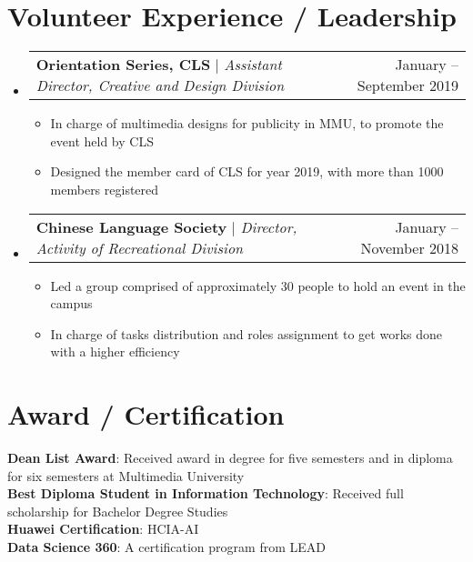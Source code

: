 \documentclass[a4,10pt]{article}
\makeatletter
\newcommand{\resumeItem}[1]{
  \item\small{
    {#1 \vspace{-2pt}}
  }
}
\newcommand{\resumeProjectHeading}[2]{
    \item
    \begin{tabular*}{0.97\textwidth}{l@{\extracolsep{\fill}}r}
      \small#1 & #2 \\
    \end{tabular*}\vspace{-6pt}
}
\newcommand{\resumeSubHeadingListStart}{\begin{itemize}[leftmargin=0.15in, label={}]}
\newcommand{\resumeSubHeadingListEnd}{\end{itemize}}
\newcommand{\resumeItemListStart}{\begin{itemize}}
\newcommand{\resumeItemListEnd}{\end{itemize}\vspace{-5pt}}
\makeatother
\begin{document}
 \section{Volunteer Experience / Leadership}
 \resumeSubHeadingListStart
 \resumeProjectHeading
 {\textbf{Orientation Series, CLS} $|$ \emph{Assistant Director, Creative and Design Division}}{January -- September 2019}
 \resumeItemListStart
 \resumeItem{In charge of multimedia designs for publicity in MMU, to promote the event held by CLS}
 \resumeItem{Designed the member card of CLS for year 2019, with more than 1000 members registered}
 \resumeItemListEnd
 \resumeProjectHeading
 {\textbf{Chinese Language Society} $|$ \emph{Director, Activity of Recreational Division}}{January -- November 2018}
 \resumeItemListStart
 \resumeItem{Led a group comprised of approximately 30 people to hold an event in the campus}
 \resumeItem{In charge of tasks distribution and roles assignment to get works done with a higher efficiency}
 \resumeItemListEnd  
 \resumeSubHeadingListEnd
 
 \section{Award / Certification}
 \begin{itemize}[leftmargin=0.15in, label={}]
    \small{\item{
     \textbf{Dean List Award}{: Received award in degree for five semesters and in diploma for six semesters at Multimedia University} \\
     \textbf{Best Diploma Student in Information Technology}{: Received full scholarship for Bachelor Degree Studies} \\
      \textbf{Huawei Certification}{: HCIA-AI} \\
     \textbf{Data Science 360}{: A certification program from LEAD} \\

    }}
 \end{itemize}
 
\end{document}
